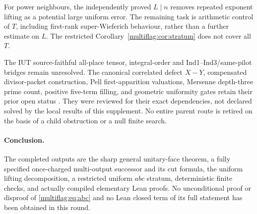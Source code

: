 For power neighbours, the independently proved \(L\mid n\) removes repeated exponent lifting as a potential large uniform error. The remaining task is arithmetic control of \(T\), including first-rank super-Wieferich behaviour, rather than a further estimate on \(L\). The restricted Corollary~\ref{multiflag:cor:stratum} does not cover all \(T\).

The IUT source-faithful all-place tensor, integral-order and Ind1--Ind3/same-pilot bridges remain unresolved. The canonical correlated defect \(X-Y\), compensated divisor-packet construction, Pell first-apparition valuations, Mersenne depth-three prime count, positive five-term filling, and geometric uniformity gates retain their prior open status \cite{multiflag:ledger}. They were reviewed for their exact dependencies, not declared solved by the local results of this supplement. No entire parent route is retired on the basis of a child obstruction or a null finite search.

\paragraph{Conclusion.}
The completed outputs are the sharp general unitary-face theorem, a fully specified once-charged multi-output successor and its cut formula, the uniform lifting decomposition, a restricted uniform \(abc\) stratum, deterministic finite checks, and actually compiled elementary Lean proofs. No unconditional proof or disproof of \eqref{multiflag:eq:abc} and no Lean closed term of its full statement has been obtained in this round.



\endgroup

